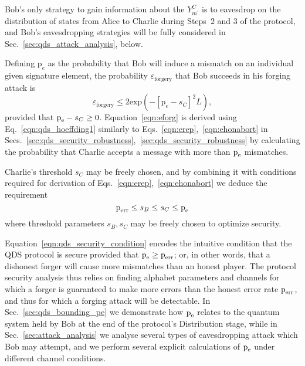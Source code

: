 Bob's only strategy to gain information about the $Y_{m^\prime}^C$ is to eavesdrop on the distribution of states from Alice to Charlie during Steps~$2$ and $3$ of the protocol, and Bob's eavesdropping strategies will be fully considered in Sec.~\ref{sec:qds_attack_analysis}, below.

Defining $\text{p}_e$ as the probability that Bob will induce a mismatch on an individual given signature element, the probability $\varepsilon_{\text{forgery}}$ that Bob succeeds in his forging attack is
\begin{equation}\label{eqn:eforg}
\varepsilon_{\text{forgery}} \le 2 \text{exp}\left( - \left[\text{p}_e - s_C\right]^2 L\right), 
\end{equation}
provided that $\text{p}_{\text{e}} - s_C \ge 0$. Equation~\ref{eqn:eforg} is derived using Eq.~\ref{eqn:qds_hoeffding1} similarly to Eqs.~\ref{eqn:erep},~\ref{eqn:ehonabort} in Secs.~\ref{sec:qds_security_robustness},~\ref{sec:qds_security_robustness} by calculating the probability that Charlie accepts a message with more than $\text{p}_{\text{e}}$ mismatches.

Charlie's threshold $s_C$ may be freely chosen, and by combining it with conditions required for derivation of Eqs.~\ref{eqn:erep},~\ref{eqn:ehonabort} we deduce the requirement
\begin{equation}\label{eqn:qds_security_condition}
\text{p}_{\text{err}} \le s_B \le s_C \le \text{p}_{\text{e}} 
\end{equation}
where threshold parameters $s_B, s_C$ may be freely chosen to optimize security. 

Equation~\ref{eqn:qds_security_condition} encodes the intuitive condition that the QDS protocol is secure provided that $\text{p}_{\text{e}} \ge \text{p}_{\text{err}}$; or, in other words, that a dishonest forger will cause more mismatches than an honest player. The protocol security analysis thus relies on finding alphabet parameters and channels for which a forger is guaranteed to make more errors than the honest error rate $\text{p}_{\text{err}}$, and thus for which a forging attack will be detectable. In Sec.~\ref{sec:qds_bounding_pe} we demonstrate how $\text{p}_{\text{e}}$ relates to the quantum system held by Bob at the end of the protocol's Distribution stage, while in Sec.~\ref{sec:attack_analysis} we analyse several types of eavesdropping attack which Bob may attempt, and we perform several explicit calculations of $\text{p}_{\text{e}}$ under different channel conditions.


